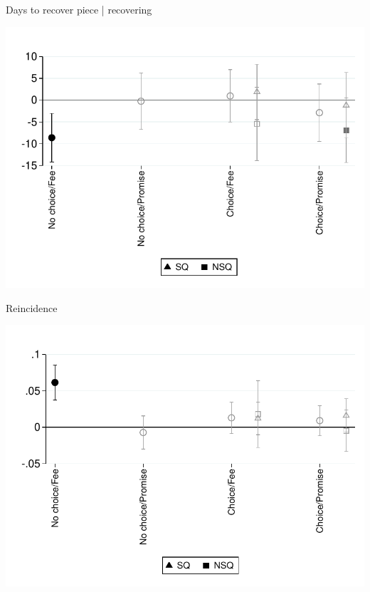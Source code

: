 \documentclass[9pt]{beamer}
\begin{document}
\begin{frame}{Days to recover piece | recovering}
    \begin{center}
        \includegraphics[width=.70\textwidth]{Figuras/te_graph_dias_al_desempenyo.pdf}
    \end{center}
\end{frame}


\begin{frame}{Reincidence}
    \begin{center}
        \includegraphics[width=.70\textwidth]{Figuras/te_graph_reincidence.pdf}
    \end{center}
\end{frame}
\end{document}
